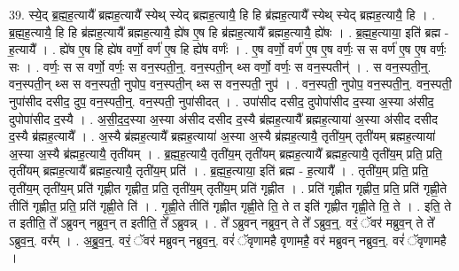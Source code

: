 \documentclass[17pt]{extarticle}
\begin{document}
39. स्ये॒द् ब्र॒ह्म॒ह॒त्यायै᳚ ब्रह्मह॒त्यायै᳚ स्येथ् स्येद् ब्रह्मह॒त्यायै॒ हि हि ब्र॑ह्मह॒त्यायै᳚ स्येथ् स्येद् ब्रह्मह॒त्यायै॒ हि । . ब्र॒ह्म॒ह॒त्यायै॒ हि हि ब्र॑ह्मह॒त्यायै᳚ ब्रह्मह॒त्यायै॒ ह्ये॑ष ए॒ष हि ब्र॑ह्मह॒त्यायै᳚ ब्रह्मह॒त्यायै॒ ह्ये॑षः । . ब्र॒ह्म॒ह॒त्याया॒ इति॑ ब्रह्म - ह॒त्यायै᳚ । . ह्ये॑ष ए॒ष हि ह्ये॑ष वर्णो॒ वर्ण॑ ए॒ष हि ह्ये॑ष वर्णः॑ । . ए॒ष वर्णो॒ वर्ण॑ ए॒ष ए॒ष वर्णः॒ स स वर्ण॑ ए॒ष ए॒ष वर्णः॒ सः । . वर्णः॒ स स वर्णो॒ वर्णः॒ स वन॒स्पती॒न्॒. वन॒स्पती॒न् थ्स वर्णो॒ वर्णः॒ स वन॒स्पतीन्॑ । . स वन॒स्पती॒न्॒. वन॒स्पती॒न् थ्स स वन॒स्पती॒ नुपोप॒ वन॒स्पती॒न् थ्स स वन॒स्पती॒ नुप॑ । . वन॒स्पती॒ नुपोप॒ वन॒स्पती॒न्॒. वन॒स्पती॒ नुपा॑सीद दसीद॒ दुप॒ वन॒स्पती॒न्॒. वन॒स्पती॒ नुपा॑सीदत् । . उपा॑सीद दसीद॒ दुपोपा॑सीद द॒स्या अ॒स्या अ॑सीद॒ दुपोपा॑सीद द॒स्यै । . अ॒सी॒द॒द॒स्या अ॒स्या अ॑सीद दसीद द॒स्यै ब्र॑ह्मह॒त्यायै᳚ ब्रह्मह॒त्याया॑ अ॒स्या अ॑सीद दसीद द॒स्यै ब्र॑ह्मह॒त्यायै᳚ । . अ॒स्यै ब्र॑ह्मह॒त्यायै᳚ ब्रह्मह॒त्याया॑ अ॒स्या अ॒स्यै ब्र॑ह्मह॒त्यायै॒ तृती॑य॒म् तृती॑यम् ब्रह्मह॒त्याया॑ अ॒स्या अ॒स्यै ब्र॑ह्मह॒त्यायै॒ तृती॑यम् । . ब्र॒ह्म॒ह॒त्यायै॒ तृती॑य॒म् तृती॑यम् ब्रह्मह॒त्यायै᳚ ब्रह्मह॒त्यायै॒ तृती॑य॒म् प्रति॒ प्रति॒ तृती॑यम् ब्रह्मह॒त्यायै᳚ ब्रह्मह॒त्यायै॒ तृती॑य॒म् प्रति॑ । . ब्र॒ह्म॒ह॒त्याया॒ इति॑ ब्रह्म - ह॒त्यायै᳚ । . तृती॑य॒म् प्रति॒ प्रति॒ तृती॑य॒म् तृती॑य॒म् प्रति॑ गृह्णीत गृह्णीत॒ प्रति॒ तृती॑य॒म् तृती॑य॒म् प्रति॑ गृह्णीत । . प्रति॑ गृह्णीत गृह्णीत॒ प्रति॒ प्रति॑ गृह्णी॒ते तीति॑ गृह्णीत॒ प्रति॒ प्रति॑ गृह्णी॒ते ति॑ । . गृ॒ह्णी॒ते तीति॑ गृह्णीत गृह्णी॒ते ति॒ ते त इति॑ गृह्णीत गृह्णी॒ते ति॒ ते । . इति॒ ते त इतीति॒ ते᳚ ऽब्रुवन् नब्रुव॒न् त इतीति॒ ते᳚ ऽब्रुवन्न् । . ते᳚ ऽब्रुवन् नब्रुव॒न् ते ते᳚ ऽब्रुव॒न्॒. वरं॒ ॅवर॑ मब्रुव॒न् ते ते᳚ ऽब्रुव॒न्॒. वर᳚म् । . अ॒ब्रु॒व॒न्॒. वरं॒ ॅवर॑ मब्रुवन् नब्रुव॒न्॒. वरं॑ ॅवृणामहै वृणामहै॒ वर॑ मब्रुवन् नब्रुव॒न्॒. वरं॑ ॅवृणामहै । \newline
\end{document}
